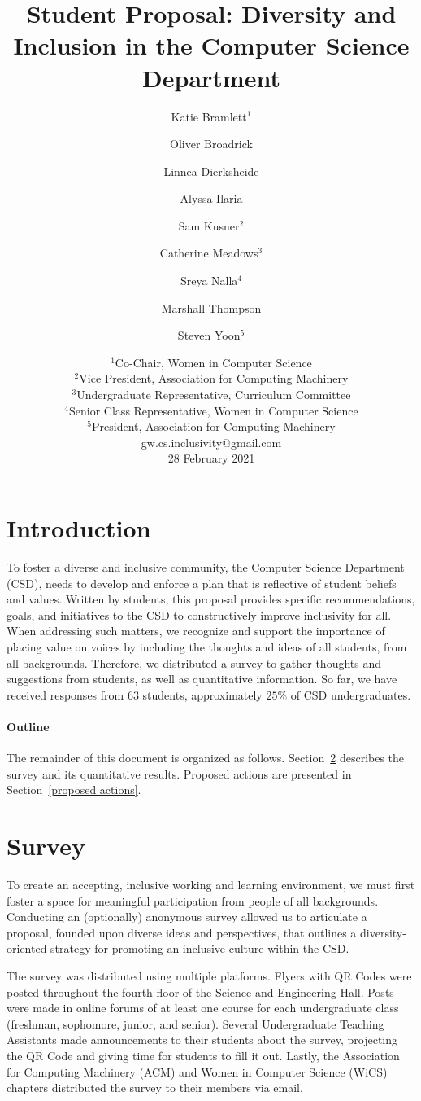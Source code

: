 \documentclass{article}
\title{Student Proposal: Diversity and Inclusion in the Computer Science Department}
\author{
Katie Bramlett$^1$\and
Oliver Broadrick\and
Linnea Dierksheide\and
Alyssa Ilaria\and
Sam Kusner$^2$\and
Catherine Meadows$^3$\and
Sreya Nalla$^4$\and
Marshall Thompson\and
Steven Yoon$^5$
}
\date{%
    $^1$Co-Chair, Women in Computer Science\\
    $^2$Vice President, Association for Computing Machinery\\
    $^3$Undergraduate Representative, Curriculum Committee\\
    $^4$Senior Class Representative, Women in Computer Science\\
    $^5$President, Association for Computing Machinery\\
    gw.cs.inclusivity@gmail.com\\
    28 February 2021
}
\begin{document}
\maketitle

\section{Introduction}
To foster a diverse and inclusive community, the Computer Science Department (CSD), 
needs to develop and enforce a plan that is reflective of student beliefs and values.
Written by students, this proposal
provides specific recommendations, goals, and initiatives
to the CSD to constructively improve
inclusivity for all.
When addressing such matters, we recognize and support the importance of 
placing value on voices by including the thoughts and ideas of all students, from all backgrounds.
Therefore, we distributed a survey to gather thoughts and suggestions from students, as well as 
quantitative information. So far, we have
received responses from $63$ students, approximately $25\%$ of CSD undergraduates.

\paragraph{Outline}
The remainder of this document is organized as follows.
Section~\ref{survey} describes the survey and its quantitative results.
Proposed actions are presented in Section~\ref{proposed actions}.

\section{Survey}\label{survey}
To create an accepting, inclusive working and learning environment, we must 
first foster a space for meaningful participation from people of all backgrounds.
Conducting an (optionally) anonymous survey allowed us to articulate a proposal, 
founded upon diverse ideas and perspectives, that outlines a diversity-oriented
strategy for promoting an inclusive culture within the CSD.

The survey was distributed using multiple platforms. Flyers with QR Codes were posted
throughout the fourth floor of the Science and Engineering Hall.
Posts were made in online forums of at least one course
for each undergraduate class (freshman, sophomore, junior, and senior).
Several Undergraduate Teaching Assistants made announcements to their 
students about the survey, projecting the QR Code and giving time
for students to fill it out. Lastly, the Association for Computing Machinery (ACM) and Women 
in Computer Science (WiCS) chapters distributed the survey to their members via email. 
\end{document}
